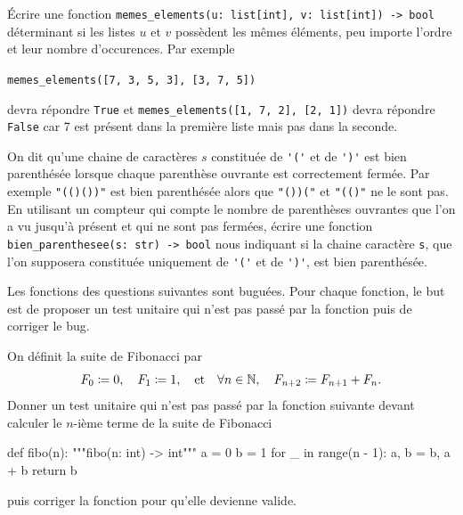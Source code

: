 \documentclass{magnolia}
\begin{document}
Écrire une fonction \verb!memes_elements(u: list[int], v: list[int]) -> bool! déterminant si les
listes $u$ et $v$ possèdent les mêmes éléments, peu importe l'ordre et leur nombre d'occurences.
Par exemple
\begin{center}
  \verb!memes_elements([7, 3, 5, 3], [3, 7, 5])!
\end{center}
  devra répondre \verb!True! et
\verb!memes_elements([1, 7, 2], [2, 1])! devra répondre \verb!False! car 7 est présent dans la
première liste mais pas dans la seconde.

On dit qu'une chaine de caractères $s$ constituée de \verb_'('_ et de \verb_')'_ est bien parenthésée lorsque
chaque parenthèse ouvrante est correctement fermée. Par exemple
\verb_"(()())"_ est bien parenthésée alors que \verb_"())("_ et \verb_"(()"_ ne le sont pas.\\

En utilisant
un compteur qui compte le nombre de parenthèses ouvrantes que l'on a vu jusqu'à présent et qui ne sont pas fermées,
écrire une fonction \verb!bien_parenthesee(s: str) -> bool! nous indiquant si la chaine caractère \verb!s!,
que l'on supposera constituée uniquement de \verb_'('_ et de \verb_')'_, est bien parenthésée.



Les fonctions des questions suivantes sont buguées. Pour chaque fonction, le but est de proposer un test unitaire
qui n'est pas passé par la fonction puis de corriger le bug.
\begin{questions}
\question On définit la suite de Fibonacci par
  \[F_0\coloneqq 0,\quad F_1\coloneqq 1,\quad \text{et}\quad \forall n\in\mathbb{N},\quad F_{n+2}\coloneqq F_{n+1}+F_n.\]
  Donner un test unitaire qui n'est pas passé par la fonction suivante devant calculer le $n$-ième terme
  de la suite de Fibonacci
\begin{pythoncode}
def fibo(n):
    """fibo(n: int) -> int"""
    a = 0
    b = 1
    for _ in range(n - 1):
        a, b = b, a + b
    return b
\end{pythoncode}
  puis corriger la fonction pour qu'elle devienne valide.
\end{questions}

\end{document}
